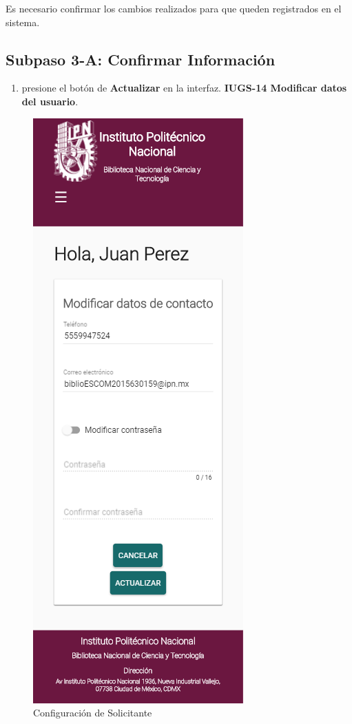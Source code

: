 	Es necesario confirmar los cambios realizados para que 
queden registrados en el sistema. 

\subsection{Subpaso 3-A: Confirmar Información}
\begin{enumerate}
	\item presione el botón de \textbf{Actualizar} en la interfaz.
		\textbf{IUGS-14 Modificar datos del usuario}.
\end{enumerate}
\begin{figure}[hbtp]
		
		\includegraphics[scale=0.3]{images/InterfazMovil/IUGS08_modificacion.png}
		\caption{Configuración de Solicitante}
	\end{figure}
